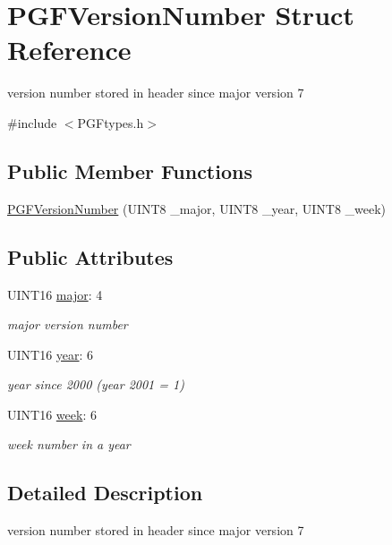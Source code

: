 \hypertarget{structPGFVersionNumber}{}\section{P\+G\+F\+Version\+Number Struct Reference}
\label{structPGFVersionNumber}


version number stored in header since major version 7  




{\ttfamily \#include $<$P\+G\+Ftypes.\+h$>$}

\subsection*{Public Member Functions}
\begin{DoxyCompactItemize}
\item 
\mbox{\hyperlink{structPGFVersionNumber_a4293f51debdbadd08f42775d0322275f}{P\+G\+F\+Version\+Number}} (U\+I\+N\+T8 \+\_\+major, U\+I\+N\+T8 \+\_\+year, U\+I\+N\+T8 \+\_\+week)
\end{DoxyCompactItemize}
\subsection*{Public Attributes}
\begin{DoxyCompactItemize}
\item 
U\+I\+N\+T16 \mbox{\hyperlink{structPGFVersionNumber_a382f48922a9135e41e53f60e28815af2}{major}}\+: 4
\begin{DoxyCompactList}\small\item\em major version number \end{DoxyCompactList}\item 
U\+I\+N\+T16 \mbox{\hyperlink{structPGFVersionNumber_ab4eaf66cd93fcf46b5dcc06dbe44837f}{year}}\+: 6
\begin{DoxyCompactList}\small\item\em year since 2000 (year 2001 = 1) \end{DoxyCompactList}\item 
U\+I\+N\+T16 \mbox{\hyperlink{structPGFVersionNumber_a4391fcda3b38f0514dff17ea5c0ea81e}{week}}\+: 6
\begin{DoxyCompactList}\small\item\em week number in a year \end{DoxyCompactList}\end{DoxyCompactItemize}


\subsection{Detailed Description}
version number stored in header since major version 7 

